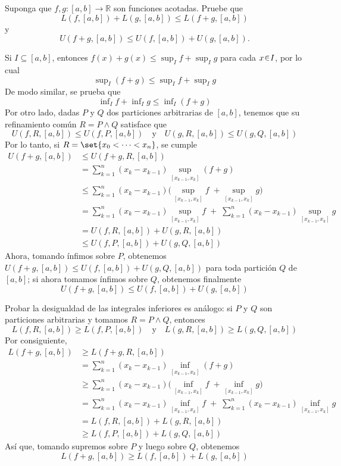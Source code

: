 
\setcounter{eje}{2} %
\begin{ejer}
Suponga que $f, g\colon [a, b] \to \mathbb{R}$ son funciones acotadas. Pruebe que
$$
L(f, [a, b]) + L(g, [a, b]) \leq L(f + g, [a, b])
$$
y
$$
U(f + g, [a, b]) \leq U(f, [a, b]) + U(g, [a, b]).
$$
\end{ejer}
\begin{sol}
Si $I\subseteq [a,b]$, entonces $f(x) + g(x) \leq \sup_I f + \sup_I g$ para cada $x\en I$, por lo cual 
\[
\sup\nolimits_I(f+g) \leq \sup\nolimits_I f + \sup\nolimits_I g
\]
De modo similar, se prueba que 
\[
\inf\nolimits_I f + \inf\nolimits_Ig \leq \inf\nolimits_I(f+g)
\]
Por otro lado, dadas $P$ y $Q$ dos particiones arbitrarias de $[a,b]$, tenemos que su refinamiento común $R = P \wedge Q$ satisface que
\[
U(f,R,[a,b]) \leq U(f,P,[a,b])%
\quad\text{y}\quad%
U(g,R,[a,b]) \leq U(g,Q,[a,b])
\]
Por lo tanto, si $R = \set{x_0 < \cdots < x_n}$, se cumple
\begin{align*}
U(f+g,[a,b])
&\leq U(f+g,R,[a,b])\\
&= \sum^n_{k=1} (x_k-x_{k-1})\sup_{[x_{k-1},x_k]} (f+g)\\
&\leq \sum^n_{k=1} (x_k-x_{k-1})\big({\sup_{[x_{k-1},x_k]}f} \;+ {\sup_{[x_{k-1},x_k]}g}\big)\\
&= \sum^n_{k=1} (x_k-x_{k-1}){\sup_{[x_{k-1},x_k]}f} \;+\; \sum^n_{k=1} (x_k-x_{k-1}){\sup_{[x_{k-1},x_k]}g}\\
&= U(f,R,[a,b]) + U(g,R,[a,b])\\
&\leq U(f,P,[a,b]) + U(g,Q,[a,b])
\end{align*}
Ahora, tomando ínfimos sobre $P$, obtenemos $U(f+g,[a,b]) \leq U(f,[a,b]) + U(g,Q,[a,b])$ para toda partición $Q$ de $[a,b]$; si ahora tomamos ínfimos sobre $Q$, obtenemos finalmente
\[
U(f+g,[a,b]) \leq U(f,[a,b]) + U(g,[a,b])
\]

Probar la desigualdad de las integrales inferiores es análogo: si $P$ y $Q$ son particiones arbitrarias y tomamos $R = P \wedge Q$, entonces
\[
L(f,R,[a,b]) \geq L(f,P,[a,b])%
\quad\text{y}\quad%
L(g,R,[a,b]) \geq L(g,Q,[a,b])
\]
Por consiguiente,
\begin{align*}
L(f+g,[a,b])
&\geq L(f+g,R,[a,b])\\
&= \sum^n_{k=1} (x_k-x_{k-1})\inf_{[x_{k-1},x_k]} (f+g)\\
&\geq \sum^n_{k=1} (x_k-x_{k-1})\big({\inf_{[x_{k-1},x_k]}f} \;+ {\inf_{[x_{k-1},x_k]}g}\big)\\
&= \sum^n_{k=1} (x_k-x_{k-1}){\inf_{[x_{k-1},x_k]}f} \;+\; \sum^n_{k=1} (x_k-x_{k-1}){\inf_{[x_{k-1},x_k]}g}\\
&= L(f,R,[a,b]) + L(g,R,[a,b])\\
&\geq L(f,P,[a,b]) + L(g,Q,[a,b])
\end{align*}
Así que, tomando supremos sobre $P$ y luego sobre $Q$, obtenemos
\[
L(f+g,[a,b]) \geq L(f,[a,b]) + L(g,[a,b])
\]
\end{sol}